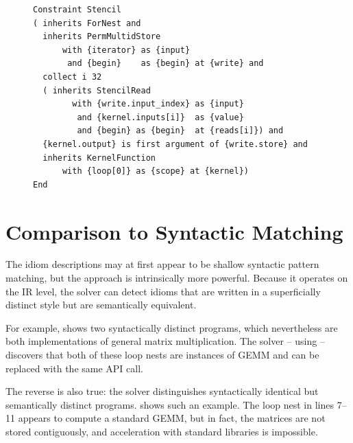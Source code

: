 \begin{figure}[t]
\begin{lstlisting}[language=IDL, label={fig:stencilcompute}, caption=
   {IDL specification of a basic stencil computation}]
Constraint Stencil
( inherits ForNest and
  inherits PermMultidStore
      with {iterator} as {input}
       and {begin}    as {begin} at {write} and
  collect i 32
  ( inherits StencilRead
        with {write.input_index} as {input}
         and {kernel.inputs[i]}  as {value}
         and {begin} as {begin}  at {reads[i]}) and
  {kernel.output} is first argument of {write.store} and
  inherits KernelFunction
      with {loop[0]} as {scope} at {kernel})
End
\end{lstlisting}
\end{figure}

\section{Comparison to Syntactic Matching}
\label{sec:syntacticmatching}

    The idiom descriptions may at first appear to be shallow syntactic pattern
    matching, but the approach is intrinsically more powerful.
    Because it operates on the IR level, the solver can detect idioms that are
    written in a superficially distinct style but are semantically equivalent.

    For example,  shows two syntactically distinct
    programs, which nevertheless are both implementations of general matrix
    multiplication.
    The solver -- using  -- discovers that both of these
    loop nests are instances of GEMM and can be replaced with the same API call.

    The reverse is also true: the solver distinguishes syntactically identical
    but semantically distinct programs.
     shows such an example.
    The loop nest in lines 7--11 appears to compute a standard GEMM, but in fact,
    the matrices are not stored contiguously, and acceleration with standard
    libraries is impossible.

